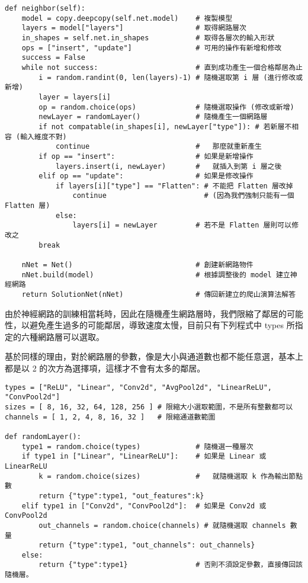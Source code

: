 \documentclass{article}
\begin{document}
\begin{minipage}{\linewidth}
\begin{lstlisting}
def neighbor(self):
    model = copy.deepcopy(self.net.model)    # 複製模型
    layers = model["layers"]                 # 取得網路層次
    in_shapes = self.net.in_shapes           # 取得各層次的輸入形狀
    ops = ["insert", "update"]               # 可用的操作有新增和修改
    success = False
    while not success:                       # 直到成功產生一個合格鄰居為止
        i = random.randint(0, len(layers)-1) # 隨機選取第 i 層 (進行修改或新增)
        layer = layers[i]
        op = random.choice(ops)              # 隨機選取操作 (修改或新增)
        newLayer = randomLayer()             # 隨機產生一個網路層
        if not compatable(in_shapes[i], newLayer["type"]): # 若新層不相容 (輸入維度不對)
            continue                         #   那麼就重新產生
        if op == "insert":                   # 如果是新增操作
            layers.insert(i, newLayer)       #   就插入到第 i 層之後
        elif op == "update":                 # 如果是修改操作
            if layers[i]["type"] == "Flatten": # 不能把 Flatten 層改掉
                continue                       # (因為我們強制只能有一個 Flatten 層)
            else:
                layers[i] = newLayer         # 若不是 Flatten 層則可以修改之
        break

    nNet = Net()                             # 創建新網路物件
    nNet.build(model)                        # 根據調整後的 model 建立神經網路
    return SolutionNet(nNet)                 # 傳回新建立的爬山演算法解答
\end{lstlisting}
\end{minipage}

由於神經網路的訓練相當耗時，因此在隨機產生網路層時，我們限縮了鄰居的可能性，以避免產生過多的可能鄰居，導致速度太慢，目前只有下列程式中 types 所指定的六種網路層可以選取。

基於同樣的理由，對於網路層的參數，像是大小與通道數也都不能任意選，基本上都是以 2 的次方為選擇項，這樣才不會有太多的鄰居。

\begin{minipage}{\linewidth}
\begin{lstlisting}
types = ["ReLU", "Linear", "Conv2d", "AvgPool2d", "LinearReLU", "ConvPool2d"]
sizes = [ 8, 16, 32, 64, 128, 256 ] # 限縮大小選取範圍，不是所有整數都可以
channels = [ 1, 2, 4, 8, 16, 32 ]   # 限縮通道數範圍

def randomLayer():
    type1 = random.choice(types)             # 隨機選一種層次
    if type1 in ["Linear", "LinearReLU"]:    # 如果是 Linear 或 LinearReLU
        k = random.choice(sizes)             #   就隨機選取 k 作為輸出節點數
        return {"type":type1, "out_features":k}
    elif type1 in ["Conv2d", "ConvPool2d"]:  # 如果是 Conv2d 或 ConvPool2d
        out_channels = random.choice(channels) # 就隨機選取 channels 數量
        return {"type":type1, "out_channels": out_channels}
    else:                                    
        return {"type":type1}                # 否則不須設定參數，直接傳回該隨機層。
\end{lstlisting}
\end{minipage}
\end{document}
